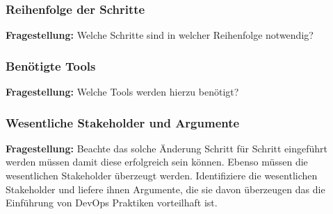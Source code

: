 

\subsubsection{Reihenfolge der Schritte}

\textbf{Fragestellung:} Welche Schritte sind in welcher Reihenfolge notwendig?



\subsubsection{Benötigte Tools}

\textbf{Fragestellung:} Welche Tools werden hierzu benötigt?

\subsubsection{Wesentliche Stakeholder und Argumente}

\textbf{Fragestellung:} Beachte das solche Änderung Schritt für Schritt eingeführt werden müssen damit diese
erfolgreich sein können. Ebenso müssen die wesentlichen Stakeholder überzeugt werden.
Identifiziere die wesentlichen Stakeholder und liefere ihnen Argumente, die sie davon
überzeugen das die Einführung von DevOps Praktiken vorteilhaft ist.


